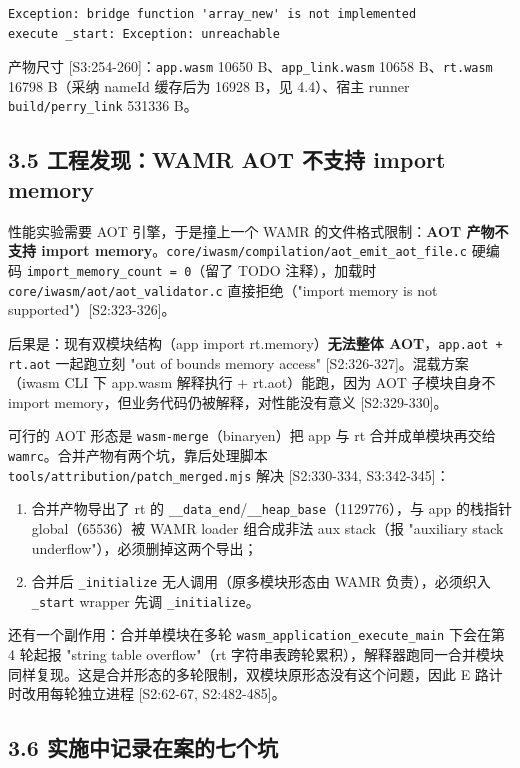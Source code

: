 \documentclass[11pt, a4paper]{article}
\begin{document}
\begin{verbatim}
Exception: bridge function 'array_new' is not implemented
execute _start: Exception: unreachable
\end{verbatim}

产物尺寸 [S3:254-260]：\texttt{app.wasm} 10650 B、\texttt{app\_link.wasm} 10658 B、\texttt{rt.wasm} 16798 B（采纳 nameId 缓存后为 16928 B，见 4.4）、宿主 runner \texttt{build/perry\_link} 531336 B。


\subsection{3.5 工程发现：WAMR AOT 不支持 import memory}

性能实验需要 AOT 引擎，于是撞上一个 WAMR 的文件格式限制：\textbf{AOT 产物不支持 import memory}。\texttt{core/iwasm/compilation/aot\_emit\_aot\_file.c} 硬编码 \texttt{import\_memory\_count = 0}（留了 TODO 注释），加载时 \texttt{core/iwasm/aot/aot\_validator.c} 直接拒绝（"import memory is not supported"）[S2:323-326]。


后果是：现有双模块结构（app import rt.memory）\textbf{无法整体 AOT}，\texttt{app.aot + rt.aot} 一起跑立刻 "out of bounds memory access" [S2:326-327]。混载方案（iwasm CLI 下 app.wasm 解释执行 + rt.aot）能跑，因为 AOT 子模块自身不 import memory，但业务代码仍被解释，对性能没有意义 [S2:329-330]。


可行的 AOT 形态是 \texttt{wasm-merge}（binaryen）把 app 与 rt 合并成单模块再交给 \texttt{wamrc}。合并产物有两个坑，靠后处理脚本 \texttt{tools/attribution/patch\_merged.mjs} 解决 [S2:330-334, S3:342-345]：


\begin{enumerate}
\item 合并产物导出了 rt 的 \texttt{\_\_data\_end}/\texttt{\_\_heap\_base}（1129776），与 app 的栈指针 global（65536）被 WAMR loader 组合成非法 aux stack（报 "auxiliary stack underflow"），必须删掉这两个导出；
\item 合并后 \texttt{\_initialize} 无人调用（原多模块形态由 WAMR 负责），必须织入 \texttt{\_start} wrapper 先调 \texttt{\_initialize}。
\end{enumerate}

还有一个副作用：合并单模块在多轮 \texttt{wasm\_application\_execute\_main} 下会在第 4 轮起报 "string table overflow"（rt 字符串表跨轮累积），解释器跑同一合并模块同样复现。这是合并形态的多轮限制，双模块原形态没有这个问题，因此 E 路计时改用每轮独立进程 [S2:62-67, S2:482-485]。


\subsection{3.6 实施中记录在案的七个坑}
\end{document}
